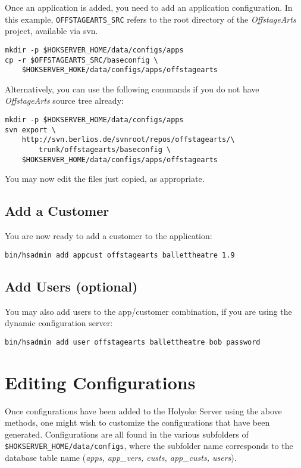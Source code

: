 \documentclass[11pt]{article}
\begin{document}
Once an application is added, you need to add an application configuration.  In this example, {\tt OFFSTAGEARTS\_SRC} refers to the root directory of the \emph{OffstageArts} project, available via svn.
\begin{verbatim}
mkdir -p $HOKSERVER_HOME/data/configs/apps
cp -r $OFFSTAGEARTS_SRC/baseconfig \
    $HOKSERVER_HOKE/data/configs/apps/offstagearts
\end{verbatim}

Alternatively, you can use the following commands if you do not have \emph{OffstageArts} source tree already:

\begin{verbatim}
mkdir -p $HOKSERVER_HOME/data/configs/apps
svn export \
    http://svn.berlios.de/svnroot/repos/offstagearts/\
        trunk/offstagearts/baseconfig \
    $HOKSERVER_HOME/data/configs/apps/offstagearts
\end{verbatim}

You may now edit the files just copied, as appropriate.

\subsection{Add a Customer}

You are now ready to add a customer to the application:
\begin{verbatim}
bin/hsadmin add appcust offstagearts ballettheatre 1.9
\end{verbatim}

\subsection{Add Users (optional)}

You may also add users to the app/customer combination, if you are using the dynamic configuration server:
\begin{verbatim}
bin/hsadmin add user offstagearts ballettheatre bob password
\end{verbatim}

\section{Editing Configurations}

Once configurations have been added to the Holyoke Server using the above methods, one might wish to customize the configurations that have been generated.  Configurations are all found in the various subfolders of {\tt \$HOKSERVER\_HOME/data/configs}, where the subfolder name corresponds to the database table name (\emph{apps, app\_vers, custs, app\_custs, users}).
\end{document}
